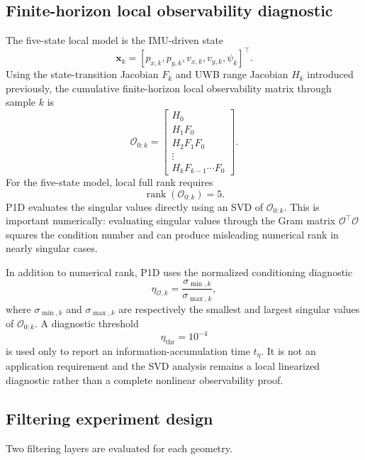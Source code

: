 \subsection{Finite-horizon local observability diagnostic}
The five-state local model is the IMU-driven state
\begin{equation}
    \bm x_k=[p_{x,k},p_{y,k},v_{x,k},v_{y,k},\psi_k]^{\top}.
\end{equation}
Using the state-transition Jacobian $F_k$ and UWB range Jacobian $H_k$ introduced previously, the cumulative finite-horizon local observability matrix through sample $k$ is
\begin{equation}
\mathcal O_{0:k}=\begin{bmatrix}
H_0\\
H_1F_0\\
H_2F_1F_0\\
\vdots\\
H_kF_{k-1}\cdots F_0
\end{bmatrix}.
\end{equation}
For the five-state model, local full rank requires
\begin{equation}
    \operatorname{rank}(\mathcal O_{0:k})=5.
\end{equation}
P1D evaluates the singular values directly using an SVD of $\mathcal O_{0:k}$. This is important numerically: evaluating singular values through the Gram matrix $\mathcal O^{\top}\mathcal O$ squares the condition number and can produce misleading numerical rank in nearly singular cases.

In addition to numerical rank, P1D uses the normalized conditioning diagnostic
\begin{equation}
    \eta_{\mathcal O,k}
    =\frac{\sigma_{\min,k}}{\sigma_{\max,k}},
\end{equation}
where $\sigma_{\min,k}$ and $\sigma_{\max,k}$ are respectively the smallest and largest singular values of $\mathcal O_{0:k}$. A diagnostic threshold
\begin{equation}
    \eta_{\mathrm{thr}}=10^{-4}
\end{equation}
is used only to report an information-accumulation time $t_{\eta}$. It is not an application requirement and the SVD analysis remains a local linearized diagnostic rather than a complete nonlinear observability proof.

\subsection{Filtering experiment design}
Two filtering layers are evaluated for each geometry.

